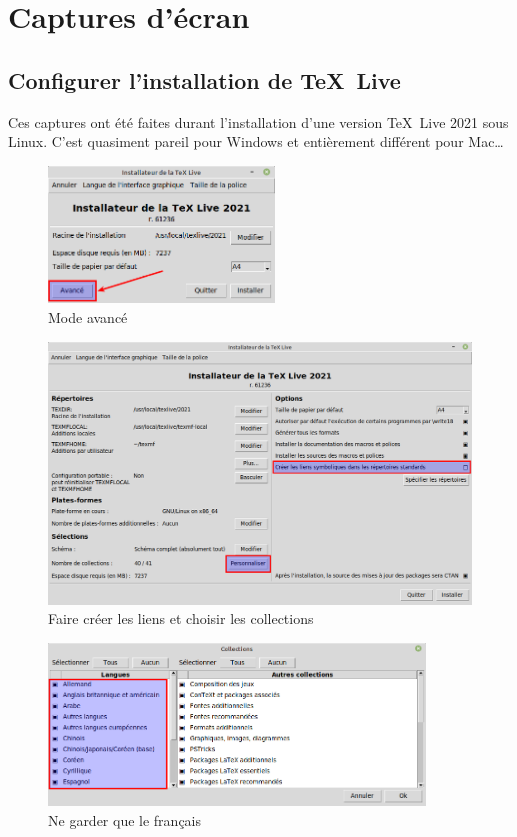 \section{Captures d'écran}
\label{sec:captures}



\subsection{Configurer l'installation de \TeX \ Live}
\label{sec:installationTl}

Ces captures ont été faites durant l'installation d'une version \TeX \ Live 2021 sous Linux. C'est quasiment pareil pour Windows et entièrement différent pour Mac\dots

\begin{figure}[H]
	\centering
	\includegraphics[width=6cm]{captures/install_TL_01.png}
	\caption{Mode avancé}
	\label{fig:captureTLInstall01}
\end{figure}

\begin{figure}[H]
	\centering
	\includegraphics[width=15cm]{captures/install_TL_02.png}
	\caption{Faire créer les liens et choisir les collections}
	\label{fig:captureTLInstall02}
\end{figure}

\begin{figure}[H]
	\centering
	\includegraphics[width=10cm]{captures/install_TL_03.png}
	\caption{Ne garder que le français}
	\label{fig:captureTLInstall03}
\end{figure}



